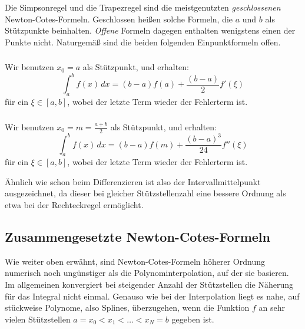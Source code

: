 Die Simpsonregel und die Trapezregel sind die meistgenutzten
\emph{geschlossenen} Newton-Cotes-Formeln. Geschlossen heißen solche
Formeln, die $a$ und $b$ als Stützpunkte beinhalten. \emph{Offene}
Formeln dagegen enthalten wenigstens einen der Punkte
nicht. Naturgemäß sind die beiden folgenden Einpunktformeln offen.

\subsubsection{}
\begin{minipage}[t]{0.74\linewidth}
  Wir benutzen $x_0=a$ als Stützpunkt, und erhalten:
  \begin{equation}
    \int_a^b f(x)\, dx = (b-a) f(a) +
    \frac{(b-a)}{2} f'(\xi)
  \end{equation}
  für ein $\xi\in[a,b]$, wobei der letzte Term wieder der Fehlerterm ist.
\end{minipage}

\newpage
\subsubsection{}
\begin{minipage}[t]{0.74\linewidth}
  Wir benutzen $x_0=m=\frac{a+b}{2}$ als Stützpunkt, und erhalten:
  \begin{equation}
    \int_a^b f(x)\, dx = (b-a) f(m) +
    \frac{(b-a)^3}{24} f''(\xi)
  \end{equation}
  für ein $\xi\in[a,b]$, wobei der letzte Term wieder der Fehlerterm
  ist.
\end{minipage}

Ähnlich wie schon beim Differenzieren ist also der
Intervallmittelpunkt ausgezeichnet, da dieser bei gleicher
Stützstellenzahl eine bessere Ordnung als etwa bei der Rechteckregel
ermöglicht.

\subsection{Zusammengesetzte Newton-Cotes-Formeln}

Wie weiter oben erwähnt, sind Newton-Cotes-Formeln höherer Ordnung
numerisch noch ungünstiger als die Polynominterpolation, auf der sie
basieren. Im allgemeinen konvergiert bei steigender Anzahl der
Stützstellen die Näherung für das Integral nicht einmal. Genauso wie
bei der Interpolation liegt es nahe, auf stückweise Polynome, also
Splines, überzugehen, wenn die Funktion $f$ an sehr vielen
Stützstellen $a=x_0< x_1 < \ldots < x_{N} = b$ gegeben ist.

